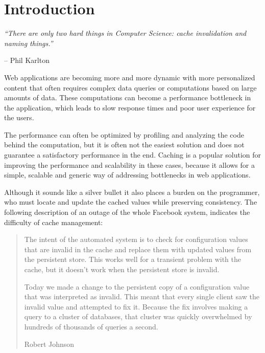 \chapter{Introduction}

\emph{``There are only two hard things in Computer Science: cache invalidation and naming things.''} \vspace{-1cm}
\begin{flushright}-- Phil Karlton\end{flushright}

Web applications are becoming more and more dynamic with more personalized content that often requires complex data queries or computations based on large amounts of data. These computations can become a performance bottleneck in the application, which leads to slow response times and poor user experience for the users.

The performance can often be optimized by profiling and analyzing the code behind the computation, but it is often not the easiest solution and does not guarantee a satisfactory performance in the end. Caching is a popular solution for improving the performance and scalability in these cases, because it allows for a simple, scalable and generic way of addressing bottlenecks in web applications.

Although it sounds like a silver bullet it also places a burden on the programmer, who must locate and update the cached values while preserving consistency. The following description of an outage of the whole Facebook system, indicates the difficulty of cache management:

\begin{quote}
  The intent of the automated system is to check for configuration values that are invalid in the cache and replace them with updated values from the persistent store. This works well for a transient problem with the cache, but it doesn’t work when the persistent store is invalid.

 Today we made a change to the persistent copy of a configuration value that was interpreted as invalid. This meant that every single client saw the invalid value and attempted to fix it. Because the fix involves making a query to a cluster of databases, that cluster was quickly overwhelmed by hundreds of thousands of queries a second.
\begin{flushright}Robert Johnson~\cite{facebook_outage}\end{flushright}
\end{quote}

